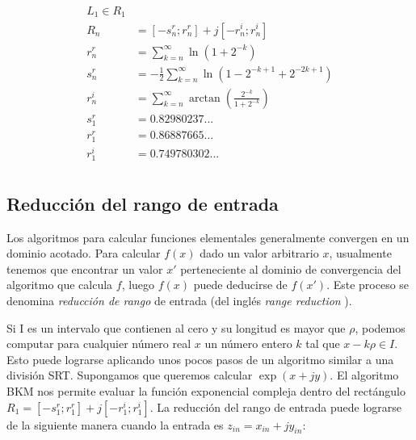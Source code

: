 \documentclass[10pt,a4paper]{book}
\begin{document}
   \begin{equation} \label{eq:convergence_range_E}
      \begin{aligned}
         L_1 \in R_1                                                          \\
         R_n   &= [-s_n^r; r_n^r] + j [-r_n^i; r_n^i]                         \\
         r_n^r &= \sum_{k=n}^{\infty}  \ln(1+2^{-k})                          \\
         s_n^r &= -\frac{1}{2} \sum_{k=n}^{\infty}  \ln(1-2^{-k+1}+2^{-2k+1}) \\
         r_n^i &= \sum_{k=n}^{\infty}  \arctan(\frac{2^{-k}}{1+2^{-k}})       \\
         s_1^r &= 0.82980237...                                               \\
         r_1^r &= 0.86887665...                                               \\
         r_1^i &= 0.749780302...                                              \\
      \end{aligned}
   \end{equation}

   \subsection{Reducción del rango de entrada}


   Los algoritmos para calcular funciones elementales generalmente convergen en un dominio acotado. Para calcular $f(x)$ dado un valor arbitrario $x$, usualmente tenemos que encontrar un valor $x'$ perteneciente al dominio de convergencia del algoritmo que calcula $f$, luego $f(x)$ puede deducirse de $f(x')$. Este proceso se denomina \textit{reducción de rango} de entrada (del inglés \textit{range reduction} ).

   Si I es un intervalo que contienen al cero y su longitud es mayor que $\rho$, podemos computar para cualquier número real $x$ un número entero $k$ tal que $x-k\rho \in I$. Esto puede lograrse aplicando unos pocos pasos de un algoritmo similar a una división SRT. Supongamos que queremos calcular  $\exp(x+jy)$. El algoritmo BKM nos permite evaluar la función exponencial compleja dentro del rectángulo $R_1 = [-s_1^r; r_1^r] + j [-r_1^i; r_1^i]$.
   La reducción del rango de entrada puede lograrse de la siguiente manera cuando la entrada es $z_{in} = x_{in} + j y_{in}$:
\end{document}
